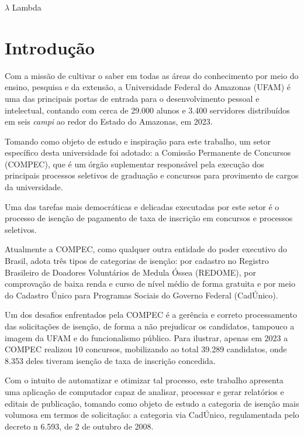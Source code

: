 \documentclass[
	12pt,			%
	openright,		%
	oneside,	
	a4paper,		%
	english,		%
	brazil			%
]{abntex2/abntex2}  %
\begin{document}
\begin{simbolos}
  \item[$ \lambda $] Lambda
\end{simbolos}

\tableofcontents*
\cleardoublepage

\textual

\chapter{Introdução}
	
	Com a missão de cultivar o saber em todas as áreas do conhecimento por meio do ensino, pesquisa e da extensão, a Universidade Federal do Amazonas (UFAM) é uma das principais
	portas de entrada para o desenvolvimento pessoal e intelectual, contando com cerca de 29.000 alunos e 3.400 servidores distribuídos em seis \textit{campi} ao redor do Estado do Amazonas, em 2023.
	
	Tomando como objeto de estudo e inspiração para este trabalho, um setor específico desta universidade foi adotado: a Comissão Permanente de Concursos (COMPEC), que é um órgão
	suplementar responsável pela execução dos principais processos seletivos de graduação e concursos para provimento de cargos da universidade.
	
	Uma das tarefas mais democráticas e delicadas executadas por este setor é o processo de isenção de pagamento de taxa de inscrição em concursos e processos seletivos.
	
	Atualmente a COMPEC, como qualquer outra entidade do poder executivo do Brasil, adota três tipos de categorias de isenção: por cadastro no Registro Brasileiro de Doadores Voluntários de Medula Óssea (REDOME), por comprovação de baixa renda e curso de nível médio de forma gratuita e por meio do Cadastro Único para Programas Sociais do Governo Federal (CadÚnico).
	
	Um dos desafios enfrentados pela COMPEC é a gerência e correto processamento das solicitações de isenção, de forma a não prejudicar os candidatos, tampouco a imagem da UFAM e do funcionalismo público. Para ilustrar, apenas em 2023 a COMPEC realizou 10 concursos, mobilizando ao total 39.289 candidatos, onde 8.353 deles tiveram isenção de taxa de inscrição concedida.
	
	Com o intuito de automatizar e otimizar tal processo, este trabalho apresenta uma aplicação de computador capaz de analisar, processar e gerar relatórios e editais de publicação, tomando como objeto de estudo a categoria de isenção mais volumosa em termos de solicitação: a categoria via CadÚnico, regulamentada pelo decreto n{\textdegree} 6.593, de 2 de outubro de 2008.
	
\end{document}
